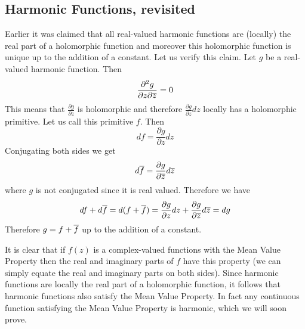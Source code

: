 \subsection{Harmonic Functions, revisited}\label{subsec:harmonic-func-revisit}
Earlier it was claimed that all real-valued harmonic functions are (locally) the real part of a holomorphic function and moreover this holomorphic function is unique up to the addition of a constant. Let us verify this claim. Let $g$ be a real-valued harmonic function. Then
$$\frac{\partial^2 g}{\partial z \partial{\overline{z}}} = 0$$
This means that $\frac{\partial g}{\partial z}$ is holomorphic and therefore $\frac{\partial g}{\partial z}dz$ locally has a holomorphic primitive. Let us call this primitive $f$. Then
$$df = \frac{\partial g}{\partial z}dz$$
Conjugating both sides we get
$$d \overline{f} = \frac{\partial g}{\partial \overline{z}} d\overline{z}$$
where $g$ is not conjugated since it is real valued. Therefore we have
$$df + d \overline{f} = d(f + \overline{f}) = \frac{\partial g}{\partial z}dz + \frac{\partial g}{\partial \overline{z}} d\overline{z} = dg$$
Therefore $g = f + \overline{f}$ up to the addition of a constant.

It is clear that if $f(z)$ is a complex-valued functions with the Mean Value Property then the real and imaginary parts of $f$ have this property (we can simply equate the real and imaginary parts on both sides). Since harmonic functions are locally the real part of a holomorphic function, it follows that harmonic functions also satisfy the Mean Value Property. In fact any continuous function satisfying the Mean Value Property is harmonic, which we will soon prove.

